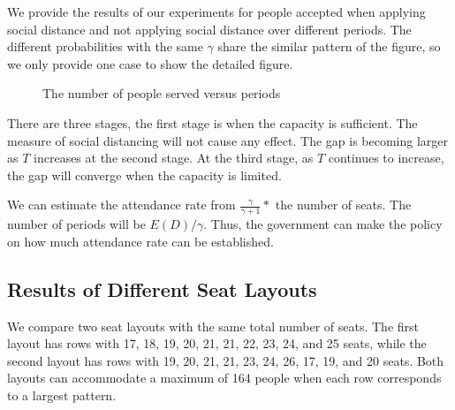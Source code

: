 We provide the results of our experiments for people accepted when applying social distance and not applying social distance over different periods. The different probabilities with the same $\gamma$ share the similar pattern of the figure, so we only provide one case to show the detailed figure.


\begin{figure}[h]
  \centering
  \caption{The number of people served versus periods}
  \label{Fig.lable}
\end{figure}


There are three stages, the first stage is when the capacity is sufficient. The measure of social distancing will not cause any effect. The gap is becoming larger as $T$ increases at the second stage. At the third stage, as $T$ continues to increase, the gap will converge when the capacity is limited.

We can estimate the attendance rate from $\frac{\gamma}{\gamma+1}*$ the number of seats. The number of periods will be $E(D)/\gamma$. Thus, the government can make the policy on how much attendance rate can be established.

\subsection{Results of Different Seat Layouts}
We compare two seat layouts with the same total number of seats. The first layout has rows with 17, 18, 19, 20, 21, 21, 22, 23, 24, and 25 seats, while the second layout has rows with 19, 20, 21, 21, 23, 24, 26, 17, 19, and 20 seats. Both layouts can accommodate a maximum of 164 people when each row corresponds to a largest pattern.

